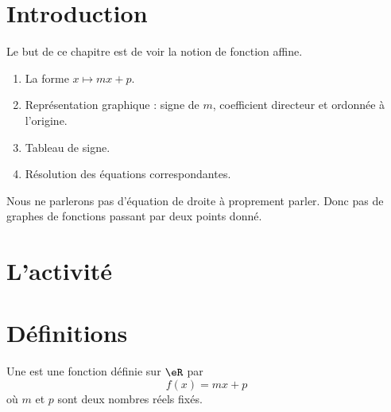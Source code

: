 
\section{Introduction}

Le but de ce chapitre est de voir la notion de fonction affine.
\begin{enumerate}
    \item
        La forme \( x\mapsto mx+p\).
    \item
        Représentation graphique : signe de \( m\), coefficient directeur et ordonnée à l'origine.
    \item
        Tableau de signe.
    \item
        Résolution des équations correspondantes.
\end{enumerate}
Nous ne parlerons pas d'équation de droite à proprement parler. Donc pas de graphes de fonctions passant par deux points donné.

\section{L'activité}



\section{Définitions}

\begin{definition}
    Une  est une fonction définie sur \( \eR\) par
    \begin{equation}
        f(x)=mx+p
    \end{equation}
    où \( m\) et \( p\) sont deux nombres réels fixés.
\end{definition}

